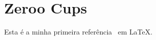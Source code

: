 
\chapter{Zeroo Cups}

Esta é a minha primeira referência~\cite{cap2:prf} em \LaTeX.

\amostradetexto

